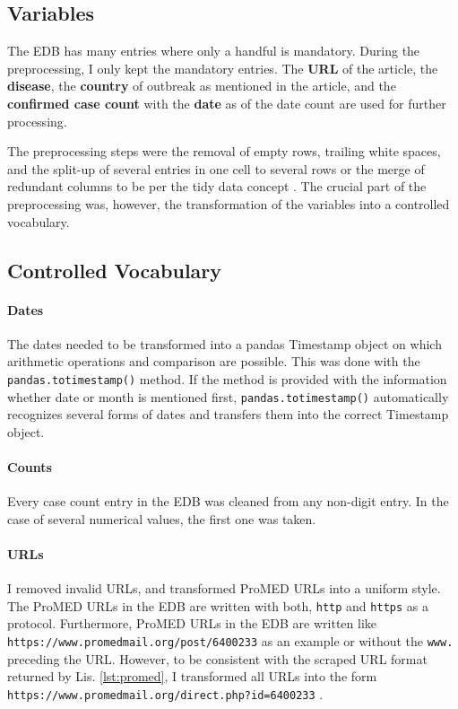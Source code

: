 \subsection{Variables}
  The EDB has many entries where only a handful is mandatory.
  During the preprocessing, I only kept the mandatory entries.
  The \textbf{URL} of the article, the \textbf{disease}, the \textbf{country} of outbreak as mentioned in the article, and the \textbf{confirmed case count} with the \textbf{date} as of the date count are used for further processing.

  The preprocessing steps were the removal of empty rows, trailing white spaces, and the split-up of several entries in one cell to several rows or the merge of redundant columns to be per the tidy data concept \citep{Wickham2014}.
  The crucial part of the preprocessing was, however, the transformation of the variables into a controlled vocabulary.

\subsection{Controlled Vocabulary}\label{controlled vocabulary}
  \paragraph{Dates}
    The dates needed to be transformed into a pandas Timestamp object on which arithmetic operations and comparison are possible.
    This was done with the \texttt{pandas.totimestamp()} method.
    If the method is provided with the information whether date or month is mentioned first, \texttt{pandas.totimestamp()} automatically recognizes several forms of dates and transfers them into the correct Timestamp object.

  \paragraph{Counts}
    Every case count entry in the EDB was cleaned from any non-digit entry.
    In the case of several numerical values, the first one was taken.

  \paragraph{URLs}
    I removed invalid URLs, and transformed ProMED URLs into a uniform style. The ProMED URLs in the EDB are written with both, \texttt{http} and \texttt{https} as a protocol. Furthermore, ProMED URLs in the EDB are written like \textquotesingle \texttt{https://\allowbreak www.promedmail.org\allowbreak /post\allowbreak /6400233} \textquotesingle as an example or without the \texttt{www.} preceding the URL. However, to be consistent with the scraped URL format returned by Lis. \ref{lst:promed}, I transformed all URLs into the form \textquotesingle \texttt{https://\allowbreak www.promedmail.org/\allowbreak direct.php?id=6400233} \textquotesingle.

